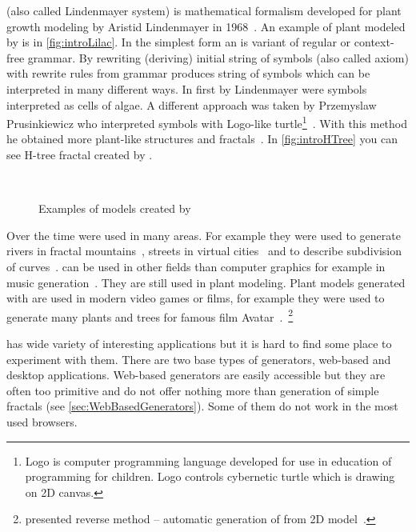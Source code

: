 
\label{sec:Introduction}

\lsystem (also called Lindenmayer system) is mathematical formalism developed for plant growth modeling by Aristid Lindenmayer in 1968~\cite{Lin68}.
An example of plant modeled by \lsystem is in \autoref{fig:introLilac}.
In the simplest form an \lsystem is variant of regular or \mbox{context-free} grammar.
By rewriting (deriving) initial string of symbols (also called axiom) with rewrite rules from grammar \lsystem produces string of symbols which can be interpreted in many different ways.
In first \lsystems by Lindenmayer were symbols interpreted as cells of algae.
A different approach was taken by Przemyslaw Prusinkiewicz who interpreted \lsystem symbols with \mbox{Logo-like} turtle\footnote{
	Logo is computer programming language developed for use in education of programming for children.
	Logo controls cybernetic turtle which is drawing on 2D canvas.}~\cite{Pru85}.
With this method he obtained more plant-like structures and fractals~\cite{CD93}.
In \autoref{fig:introHTree} you can see H-tree fractal created by \lsystem.

\begin{figure}[ht]
	\centering
	 ~
	\caption{Examples of models created by \lsystem}
\end{figure}


Over the time \lsystems were used in many areas.
For example they were used to generate rivers in fractal mountains~\cite{PH93}, streets in virtual cities~\cite{PM01} and to describe subdivision of curves~\cite{PSSK03}.
\lsystems can be used in other fields than computer graphics for example in music generation~\cite{HCJ99, Man06}.
They are still used in plant modeling.
Plant models generated with \lsystems are used in modern video games or films, for example they were used to generate many plants and trees for famous film Avatar~\cite{Wor08, Dun10}.~\footnote{\citeauthor{SBM10} presented reverse method -- automatic generation of \lsystems from 2D model~\cite{SBM10}.}

\lsystems has wide variety of interesting applications but it is hard to find some place to experiment with them.
There are two base types of \lsystem generators, web-based and desktop applications.
Web-based \lsystem generators are easily accessible but they are often too primitive and do not offer nothing more than generation of simple fractals (see \autoref{sec:WebBasedGenerators}).
Some of them do not work in the most used browsers.

